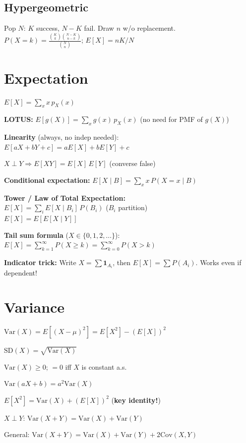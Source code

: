 \documentclass[6pt]{article}
\newcommand{\hi}[1]{\colorbox{yellow!25}{\ensuremath{#1}}}
\newcommand{\hitext}[1]{\colorbox{yellow!25}{#1}}
\begin{document}
\begin{multicols}{4}
\subsection{Hypergeometric}
Pop $N$: $K$ success, $N{-}K$ fail. Draw $n$ w/o replacement.\\
$P(X{=}k)=\frac{\binom{K}{k}\binom{N-K}{n-k}}{\binom{N}{n}}$;\; $E[X]=nK/N$

\section{Expectation}

$E[X]=\sum_x x\,p_X(x)$

\textbf{LOTUS:} $E[g(X)]=\sum_x g(x)\,p_X(x)$ (no need for PMF of $g(X)$)

\textbf{Linearity} (always, no indep needed):\\
\hi{E[aX+bY+c]=aE[X]+bE[Y]+c}

$X\perp Y \Rightarrow E[XY]=E[X]\,E[Y]$ (converse false)

\textbf{Conditional expectation:}
$E[X\mid B]=\sum_x x\,P(X{=}x\mid B)$

\textbf{Tower / Law of Total Expectation:}\\
\hi{E[X]=\sum_i E[X\mid B_i]\,P(B_i)}\; ($B_i$ partition)\\
\hi{E[X]=E[E[X\mid Y]]}

\textbf{Tail sum formula} ($X\in\{0,1,2,\ldots\}$):\\
$E[X]=\sum_{k=1}^{\infty} P(X\geq k) = \sum_{k=0}^{\infty} P(X>k)$

\hitext{\textbf{Indicator trick:} Write $X=\sum \mathbf{1}_{A_i}$, then $E[X]=\sum P(A_i)$.} Works even if dependent!

\section{Variance}

\hi{\text{Var}(X)=E[(X-\mu)^2]=E[X^2]-(E[X])^2}

$\text{SD}(X)=\sqrt{\text{Var}(X)}$

$\text{Var}(X)\geq 0$; $=0$ iff $X$ is constant a.s.

$\text{Var}(aX+b)=a^2\text{Var}(X)$

\hi{E[X^2]=\text{Var}(X)+(E[X])^2} \quad(\textbf{key identity!})

$X\perp Y$: $\text{Var}(X+Y)=\text{Var}(X)+\text{Var}(Y)$

General: $\text{Var}(X+Y)=\text{Var}(X)+\text{Var}(Y)+2\text{Cov}(X,Y)$


\end{multicols}
\end{document}
